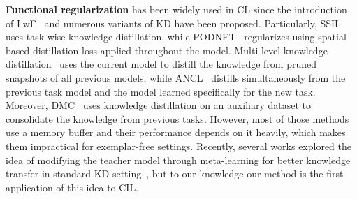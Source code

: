 \documentclass[10pt,twocolumn,letterpaper]{article}
\newcommand\rev[1]{{#1}}
\begin{document}
\rev{\textbf{Functional regularization} has been widely used in CL since the introduction of LwF~\cite{rebuffi2018efficient,hou2019learning,rebuffi2017icarl,prabhu2020gdumb} and numerous variants of KD have been proposed.} Particularly, SSIL~\cite{ahn2021ss} uses task-wise knowledge distillation, while PODNET~\cite{douillard2020podnet} regularizes using spatial-based distillation loss applied throughout the model. 
\rev{
 Multi-level knowledge distillation~\cite{ding2021multilevel} uses the current model to distill the knowledge from pruned snapshots of all previous models, while ANCL~\cite{kim2023achieving} distills simultaneously from the previous task model and the model learned specifically for the new task. Moreover, DMC~\cite{zhang2020classincremental} uses knowledge distillation on an auxiliary dataset to consolidate the knowledge from previous tasks.
}
However, most of those methods use a memory buffer and their performance depends on it heavily, which makes them impractical for exemplar-free settings. 
\rev{Recently, several works explored the idea of modifying the teacher model through meta-learning for better knowledge transfer in standard KD setting~\cite{zhou2022BERTteach,ma2022knowledge}, but to our knowledge our method is the first application of this idea to CIL.}
\end{document}
